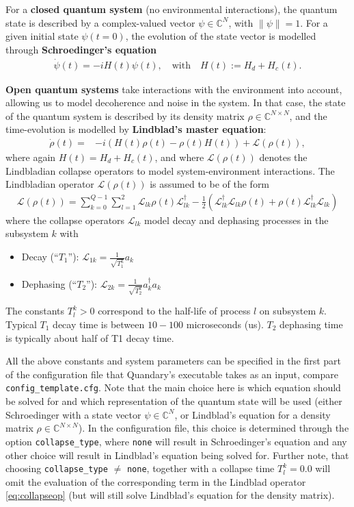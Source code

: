 \documentclass[11pt]{article}
\newcommand{\Ell}{\mathcal{L}}
\newcommand{\C}{\mathds{C}}
\begin{document}
For a \textbf{closed quantum system} (no environmental interactions), the quantum state is described by a complex-valued vector $\psi\in\C^N$, with $\|\psi\| = 1$. For a given initial state $\psi(t=0)$, the evolution of the state vector is modelled through \textbf{Schroedinger's equation}
\begin{align} \label{eq:schroedinger}
  \dot \psi(t)  = -i H(t) \psi(t), \quad \text{with} \quad  H(t) := H_d + H_c(t).
\end{align}

\textbf{Open quantum systems} take interactions with the environment into account, allowing us to model decoherence and noise in the system. In that case, the state of the quantum system is described by its density matrix $\rho\in \C^{N\times N}$, and the time-evolution is modelled by \textbf{Lindblad's master equation}:
\begin{align}\label{mastereq}
  \dot \rho(t) = &-i(H(t)\rho(t) - \rho(t)H(t)) + \Ell(\rho(t)),
\end{align}
where again $H(t) = H_d + H_c(t)$, and where $\Ell(\rho(t))$ denotes the Lindbladian collapse operators to model system-environment interactions. The Lindbladian operator $\Ell(\rho(t))$ is assumed to be of the form 
\begin{align} \label{eq:collapseop}
  \Ell(\rho(t)) = \sum_{k=0}^{Q-1} \sum_{l=1}^2 \Ell_{lk} \rho(t)
  \Ell_{lk}^{\dagger} - \frac 1 2 \left( \Ell_{lk}^{\dagger}\Ell_{lk}
  \rho(t) + \rho(t)\Ell_{lk}^{\dagger} \Ell_{lk}\right)
\end{align}
where the collapse operators $\Ell_{lk}$ model decay and dephasing processes in the subsystem $k$ with 
\begin{itemize}
  \item  Decay  (``$T_1$''): $\Ell_{1k} = \frac{1}{\sqrt{T_1^k}} a_k$
  \item  Dephasing  (``$T_2$''): $\Ell_{2k} = \frac{1}{\sqrt{T_2^k}} a_k^{\dagger}a_k$ 
\end{itemize}
The constants $T_l^k>0$ correspond to the half-life of process $l$ on subsystem $k$. Typical $T_1$ decay time is between $10-100$ microseconds (us). $T_2$ dephasing time is typically about half of T1 decay time. 

All the above constants and system parameters can be specified in the first part of the configuration file that Quandary's executable takes as an input, compare \texttt{config\_template.cfg}. 
Note that the main choice here is which equation should be solved for and which representation of the quantum state will be used (either Schroedinger with a state vector $\psi \in \C^N$, or Lindblad's equation for a density matrix $\rho \in \C^{N\times N}$). In the configuration file, this choice is determined through the option \texttt{collapse\_type}, where \texttt{none} will result in Schroedinger's equation and any other choice will result in Lindblad's equation being solved for. Further note, that choosing \texttt{collapse\_type} $\neq$ \texttt{none}, together with a collapse time $T_{l}^k = 0.0$ will omit the evaluation of the corresponding term in the Lindblad operator \eqref{eq:collapseop} (but will still solve Lindblad's equation for the density matrix).
\end{document}
